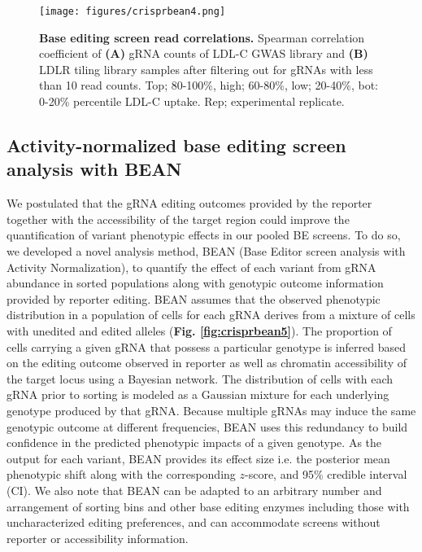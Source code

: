 \documentclass[a4paper, titlepage, openright]{book}
\begin{document}
\begin{figure}
	\centering
	\texttt{[image: figures/crisprbean4.png]}
	\caption[Base editing screen read correlations]{\textbf{Base editing screen read correlations. } Spearman correlation coefficient of \textbf{(A)} gRNA counts of LDL-C GWAS library and \textbf{(B)} LDLR tiling library samples after filtering out for gRNAs with less than 10 read counts. Top; 80-100\%, high; 60-80\%, low; 20-40\%, bot: 0-20\% percentile LDL-C uptake. Rep; experimental replicate.}
	\label{fig:crisprbean4}
\end{figure} 
\subsection{Activity-normalized base editing screen analysis with BEAN}
We postulated that the gRNA editing outcomes provided by the reporter together with the accessibility of the target region could improve the quantification of variant phenotypic effects in our pooled BE screens. To do so, we developed a novel analysis method, BEAN (Base Editor screen analysis with Activity Normalization), to quantify the effect of each variant from gRNA abundance in sorted populations along with genotypic outcome information provided by reporter editing. BEAN assumes that the observed phenotypic distribution in a population of cells for each gRNA derives from a mixture of cells with unedited and edited alleles (\textbf{Fig. \ref{fig:crisprbean5}}). The proportion of cells carrying a given gRNA that possess a particular genotype is inferred based on the editing outcome observed in reporter as well as chromatin accessibility of the target locus using a Bayesian network. The distribution of cells with each gRNA prior to sorting is modeled as a Gaussian mixture for each underlying genotype produced by that gRNA. Because multiple gRNAs may induce the same genotypic outcome at different frequencies, BEAN uses this redundancy to build confidence in the predicted phenotypic impacts of a given genotype. As the output for each variant, BEAN provides its effect size i.e. the posterior mean phenotypic shift along with the corresponding $z$-score, and 95\% credible interval (CI). We also note that BEAN can be adapted to an arbitrary number and arrangement of sorting bins and other base editing enzymes including those with uncharacterized editing preferences, and can accommodate screens without reporter or accessibility information. 
\end{document}
